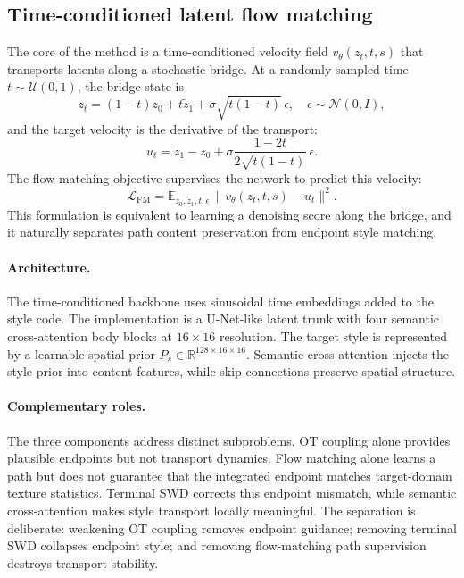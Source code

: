 ﻿\documentclass[letterpaper]{article}
\begin{document}
\subsection{Time-conditioned latent flow matching}
The core of the method is a time-conditioned velocity field $v_\theta(z_t,t,s)$ that transports latents along a stochastic bridge. At a randomly sampled time $t\sim\mathcal{U}(0,1)$, the bridge state is
\begin{equation}
    z_t = (1-t)z_0 + t\tilde{z}_1 + \sigma\sqrt{t(1-t)}\,\epsilon,
    \quad \epsilon\sim\mathcal{N}(0,I),
\end{equation}
and the target velocity is the derivative of the transport:
\begin{equation}
    u_t = \tilde{z}_1 - z_0 + \sigma\frac{1-2t}{2\sqrt{t(1-t)}}\,\epsilon .
\end{equation}
The flow-matching objective supervises the network to predict this velocity:
\begin{equation}
    \mathcal{L}_{\mathrm{FM}} = \mathbb{E}_{z_0,\tilde{z}_1,t,\epsilon}\,
    \bigl\|v_\theta(z_t,t,s) - u_t\bigr\|^2 .
\end{equation}
This formulation is equivalent to learning a denoising score along the bridge, and it naturally separates path content preservation from endpoint style matching.

\paragraph{Architecture.}
The time-conditioned backbone uses sinusoidal time embeddings added to the style code. The implementation is a U-Net-like latent trunk with four semantic cross-attention body blocks at $16\times16$ resolution. The target style is represented by a learnable spatial prior $P_s\in\mathbb{R}^{128\times16\times16}$. Semantic cross-attention injects the style prior into content features, while skip connections preserve spatial structure.

\paragraph{Complementary roles.}
The three components address distinct subproblems. OT coupling alone provides plausible endpoints but not transport dynamics. Flow matching alone learns a path but does not guarantee that the integrated endpoint matches target-domain texture statistics. Terminal SWD corrects this endpoint mismatch, while semantic cross-attention makes style transport locally meaningful. The separation is deliberate: weakening OT coupling removes endpoint guidance; removing terminal SWD collapses endpoint style; and removing flow-matching path supervision destroys transport stability.
\end{document}
